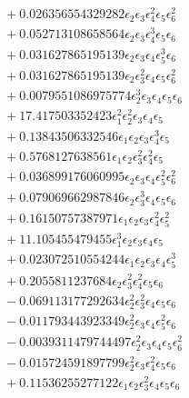 \documentclass[10pt]{article}
\begin{document}
\begin{align*}
&{}  + 0.026356554329282 \epsilon_{2} \epsilon_{3} \epsilon_{4}^{2} \epsilon_{5} \epsilon_{6}^{2} \\
&{}  + 0.052713108658564 \epsilon_{2} \epsilon_{3} \epsilon_{4}^{3} \epsilon_{5} \epsilon_{6} \\
&{}  + 0.031627865195139 \epsilon_{2} \epsilon_{3} \epsilon_{4} \epsilon_{5}^{3} \epsilon_{6} \\
&{}  + 0.031627865195139 \epsilon_{2} \epsilon_{3}^{2} \epsilon_{4} \epsilon_{5} \epsilon_{6}^{2} \\
&{}  + 0.0079551086975774 \epsilon_{2}^{3} \epsilon_{3} \epsilon_{4} \epsilon_{5} \epsilon_{6} \\
&{}  + 17.417503352423 \epsilon_{1}^{2} \epsilon_{2}^{2} \epsilon_{3} \epsilon_{4} \epsilon_{5} \\
&{}  + 0.13843506332546 \epsilon_{1} \epsilon_{2} \epsilon_{3} \epsilon_{4}^{3} \epsilon_{5} \\
&{}  + 0.5768127638561 \epsilon_{1} \epsilon_{2} \epsilon_{3}^{2} \epsilon_{4}^{2} \epsilon_{5} \\
&{}  + 0.036899176060995 \epsilon_{2} \epsilon_{3} \epsilon_{4} \epsilon_{5}^{2} \epsilon_{6}^{2} \\
&{}  + 0.079069662987846 \epsilon_{2} \epsilon_{3}^{3} \epsilon_{4} \epsilon_{5} \epsilon_{6} \\
&{}  + 0.16150757387971 \epsilon_{1} \epsilon_{2} \epsilon_{3} \epsilon_{4}^{2} \epsilon_{5}^{2} \\
&{}  + 11.105455479455 \epsilon_{1}^{3} \epsilon_{2} \epsilon_{3} \epsilon_{4} \epsilon_{5} \\
&{}  + 0.023072510554244 \epsilon_{1} \epsilon_{2} \epsilon_{3} \epsilon_{4} \epsilon_{5}^{3} \\
&{}  + 0.2055811237684 \epsilon_{2} \epsilon_{3}^{2} \epsilon_{4}^{2} \epsilon_{5} \epsilon_{6} \\
&{}  - 0.069113177292634 \epsilon_{2}^{2} \epsilon_{3}^{2} \epsilon_{4} \epsilon_{5} \epsilon_{6} \\
&{}  - 0.011793443923349 \epsilon_{2}^{2} \epsilon_{3} \epsilon_{4} \epsilon_{5}^{2} \epsilon_{6} \\
&{}  - 0.0039311479744497 \epsilon_{2}^{2} \epsilon_{3} \epsilon_{4} \epsilon_{5} \epsilon_{6}^{2} \\
&{}  - 0.015724591897799 \epsilon_{2}^{2} \epsilon_{3} \epsilon_{4}^{2} \epsilon_{5} \epsilon_{6} \\
&{}  + 0.11536255277122 \epsilon_{1} \epsilon_{2} \epsilon_{3}^{2} \epsilon_{4} \epsilon_{5} \epsilon_{6} \\

\end{align*}
\end{document}
